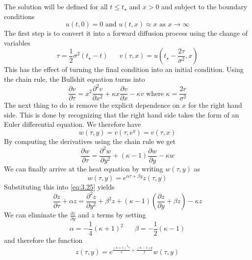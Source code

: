 \documentclass{article}
\newcommand{\pd}[2]{\frac{\partial #1}{\partial #2}}
\newcommand{\pdt}[2]{\frac{\partial ^2 #1}{\partial #2 ^2}}
\numberwithin{equation}{section}
\begin{document}
The solution will be defined for all $t\leq t_\star$ and $x>0$ and subject to the boundary conditions
\begin{equation*}
    u(t,0) = 0 \text{ and } u(t,x) \approx x \text{ as } x\rightarrow \infty
\end{equation*}
The first step is to convert it into a forward diffusion process using the change of variables 
\begin{equation}
    \tau = \frac{1}{2} \sigma^2(t_\star -t) \hspace{20pt} v(\tau,x) = u\left(t_\star - \frac{2\tau}{\sigma^2},x \right)
\end{equation}
This has the effect of turning the final condition into an initial condition. Using the chain rule, the Bullshit equation turns into 
\begin{equation}
    \pd{v}{\tau} =x^2\pdt{v}{x} +\kappa x\pd{v}{x}-\kappa v \text{ where } \kappa =\frac{2r}{\sigma^2}
\end{equation}
The next thing to do is remove the explicit dependence on $x$ for the right hand side. This is done by recognizing that the right hand side takes the form of an Euler differential equation. We therefore have
\begin{equation}
    w(\tau,y) = v(\tau,e^y)=v(\tau,x)
\end{equation}
By computing the derivatives using the chain rule we get 
\begin{equation}
    \pd{w}{\tau} = \pdt{w}{y}+(\kappa -1)\pd{w}{y} -\kappa w \label{eq:3.25}
\end{equation}
We can finally arrive at the heat equation by writing $w(\tau,y)$ as 
\begin{equation}
    w(\tau,y) = e^{\alpha \tau+\beta y}z(\tau,y)    
\end{equation}
Substituting this into \eqref{eq:3.25} yields
\begin{equation}
    \pd{z}{\tau} +\alpha z= \pdt{z}{y} +\beta^2 z+(\kappa-1)\left( \pd{z}{y}  +\beta z\right) - \kappa z
\end{equation}
We can eliminate the $\pd{z}{y}$ and $z$ terms by setting 
\begin{equation*}
    \alpha = -\frac{1}{4}(\kappa +1)^2 \hspace{20pt}\beta = -\frac{1}{2}(\kappa-1)
\end{equation*}
and therefore the function 
\begin{equation}
    z(\tau,y) =e^{\frac{(\kappa+1)^2\tau}{4}+\frac{(\kappa-1)y}{2}}w(\tau,y)
\end{equation}
\end{document}
